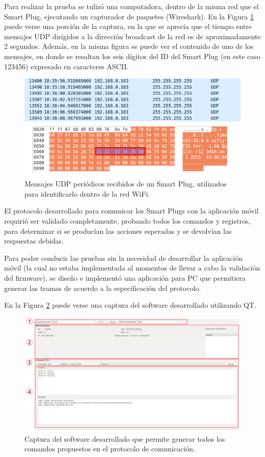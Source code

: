 Para realizar la prueba se tulizó una computadora, dentro de la misma red que el Smart Plug, ejecutando un capturador de paquetes (Wireshark). En la Figura \ref{fig:mensajes_udp} puede verse una porción de la captura, en la que se aprecia que el tiempo entre mensajes UDP dirigidos a la dirección broadcast de la red es de aproximadamente 2 segundos. Además, en la misma figura se puede ver el contenido de uno de los mensajes, en donde se resaltan los seis dígitos del ID del Smart Plug (en este caso 123456) expresado en caracteres ASCII.

\begin{figure}[h]
	\centering
	\includegraphics[width=14cm]{./Figures/4_1_2_mensajes_udp.png}
	\caption{Mensajes UDP periódicos recibidos de un Smart Plug, utilizados para identificarlo dentro de la red WiFi.}
	\label{fig:mensajes_udp}
\end{figure}


El protocolo desarrollado para comunicar los Smart Plugs con la aplicación móvil requirió ser validado completamente, probando todos los comandos y registros, para determinar si se producían las acciones esperadas y se devolvían las respuestas debidas.

Para poder conducir las pruebas sin la necesidad de desarrollar la aplicación móvil (la cual no estaba implementada al momentos de llevar a cabo la validación del firmware), se diseño e implementó una aplicación para PC que permitiera generar las tramas de acuerdo a la especificación del protocolo.

En la Figura \ref{fig:simulador_tcp} puede verse una captura del software desarrollado utilizando QT.

\begin{figure}[h]
	\centering
	\includegraphics[width=14cm]{./Figures/4_1_2_simulador_tcp.png}
	\caption{Captura del software desarrollado que permite generar todos los comandos propuestos en el protocolo de comunicación.}
	\label{fig:simulador_tcp}
\end{figure}

